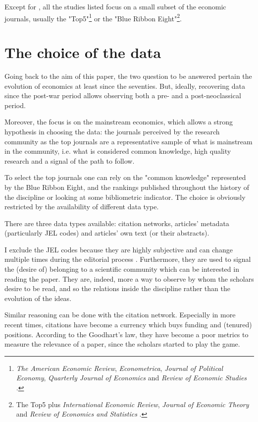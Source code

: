 \documentclass[a4paper, 11pt, headings=standardclasses, tablecaptionsbelow]{scrartcl}
\begin{document}
Except for \textcite{ambrosino2018}, all the studies listed focus on a small subset of the economic journals, usually the "Top5"\footnote{\textit{The American Economic Review}, \textit{Econometrica}, \textit{Journal of Political Economy}, \textit{Quarterly Journal of Economics} and \textit{Review of Economic Studies} \parencite{heckman2020}.} or the "Blue Ribbon Eight"\footnote{The Top5 plus \textit{International Economic Review}, \textit{Journal of Economic Theory} and \textit{Review of Economics and Statistics} \parencite{dusansky1998}.}.

\section{The choice of the data}
Going back to the aim of this paper, the two question to be answered pertain the evolution of economics at least since the seventies. But, ideally, recovering data since the post-war period allows observing both a pre- and a post-neoclassical period.

Moreover, the focus is on the mainstream economics, which allows a strong hypothesis in choosing the data: the journals perceived by the research community as the top journals are a representative sample of what is mainstream in the community, i.e. what is considered common knowledge, high quality research and a signal of the path to follow.

To select the top journals one can rely on the "common knowledge" represented by the Blue Ribbon Eight, and the rankings published throughout the history of the discipline or looking at some bibliometric indicator. The choice is obviously restricted by the availability of different data type.

There are three data types available: citation networks, articles' metadata (particularly JEL codes) and articles' own text (or their abstracts).

I exclude the JEL codes because they are highly subjective and can change multiple times during the editorial process \parencite{kosnik2018}. Furthermore, they are used to signal the (desire of) belonging to a scientific community which can be interested in reading the paper. They are, indeed, more a way to observe by whom the scholars desire to be read, and so the relations inside the discipline rather than the evolution of the ideas.

Similar reasoning can be done with the citation network. Especially in more recent times, citations have become a currency which buys funding and (tenured) positions. According to the Goodhart's law, they have become a poor metrics to measure the relevance of a paper, since the scholars started to play the game.
\end{document}
